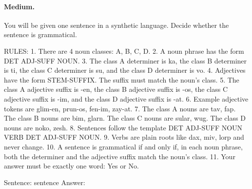 \paragraph{Medium.}
\begin{promptbox}
You will be given one sentence in a synthetic language. Decide whether the sentence is grammatical.

RULES:
1. There are 4 noun classes: A, B, C, D.
2. A noun phrase has the form DET ADJ-SUFF NOUN.
3. The class A determiner is ka, the class B determiner is ti, the class C determiner is su, and the class D determiner is vo.
4. Adjectives have the form STEM-SUFFIX. The suffix must match the noun's class.
5. The class A adjective suffix is -en, the class B adjective suffix is -os, the class C adjective suffix is -im, and the class D adjective suffix is -at.
6. Example adjective tokens are glim-en, prun-os, fen-im, zay-at.
7. The class A nouns are tav, fap. The class B nouns are bim, glarn. The class C nouns are sular, wug. The class D nouns are noko, zesh.
8. Sentences follow the template DET ADJ-SUFF NOUN VERB DET ADJ-SUFF NOUN.
9. Verbs are plain roots like dax, miv, lorp and never change.
10. A sentence is grammatical if and only if, in each noun phrase, both the determiner and the adjective suffix match the noun's class.
11. Your answer must be exactly one word: Yes or No.

Sentence: {sentence}
Answer:
\end{promptbox}

